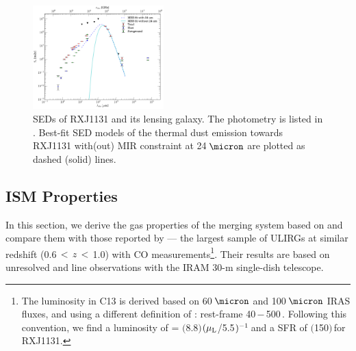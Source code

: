 \documentclass[]{emulateapj}
\begin{document}
\begin{figure}[!htbp]
\centering
\includegraphics[trim=5 5 5 5, clip, width=0.45\textwidth]{../Figures/FullSED}
\caption{SEDs of RXJ1131 and its lensing galaxy. The photometry is listed in .
Best-fit SED models of the thermal dust emission towards RXJ1131
with(out) MIR constraint at 24\,$\micron$ are plotted as dashed (solid) lines.
\label{fig:SED}}
\end{figure}

\subsection{ISM Properties} \label{sec:properties}
In this section, we derive the gas properties of the merging system
based on \bco and compare them with those reported by
 --- the largest sample of ULIRGs at similar redshift
(0.6\,$<$\,$z$\,$<$\,1.0) with CO measurements\footnote{The
\fir luminosity in C13 is derived based on 60\,$\micron$ and 100\,$\micron$ IRAS fluxes,
and using a different definition of
\LFIR: rest-frame 40\,$-$\,500\,\micron. Following this convention,
we find a \fir luminosity of
\LFIR = $($8.8$)$$(\mu_{\rm L}$/5.5$)\mbox{$^{-1}$}$\,\Lsun and
a SFR of $($150$)$\,\sfrU for RXJ1131.}.
Their results are based on unresolved \bco and  line observations with the
IRAM 30-m single-dish telescope.
\end{document}

